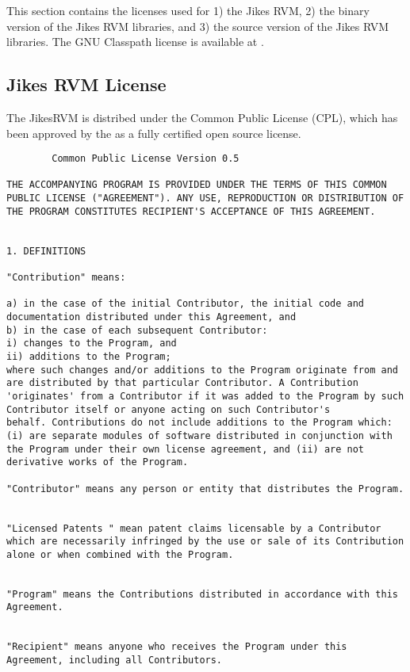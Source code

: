 This section contains the licenses used for 1) the Jikes\trademark
RVM, 2) the binary 
version of the Jikes RVM libraries, and 3) the source version of the
Jikes RVM libraries.  The GNU Classpath license is available
at \xlink{{\tt \classpathURL}}{\classpathURL}.  


\subsection{Jikes RVM License}
The Jikes\trademark RVM is distribed under the Common Public License (CPL),
which has been approved by the 
as a fully certified open source license.


\begin{verbatim}
		Common Public License Version 0.5 

THE ACCOMPANYING PROGRAM IS PROVIDED UNDER THE TERMS OF THIS COMMON
PUBLIC LICENSE ("AGREEMENT"). ANY USE, REPRODUCTION OR DISTRIBUTION OF
THE PROGRAM CONSTITUTES RECIPIENT'S ACCEPTANCE OF THIS AGREEMENT.


1. DEFINITIONS 

"Contribution" means: 

a) in the case of the initial Contributor, the initial code and
documentation distributed under this Agreement, and  
b) in the case of each subsequent Contributor:
i) changes to the Program, and
ii) additions to the Program;
where such changes and/or additions to the Program originate from and
are distributed by that particular Contributor. A Contribution
'originates' from a Contributor if it was added to the Program by such
Contributor itself or anyone acting on such Contributor's
behalf. Contributions do not include additions to the Program which:
(i) are separate modules of software distributed in conjunction with
the Program under their own license agreement, and (ii) are not
derivative works of the Program. 

"Contributor" means any person or entity that distributes the Program. 


"Licensed Patents " mean patent claims licensable by a Contributor
which are necessarily infringed by the use or sale of its Contribution
alone or when combined with the Program.  


"Program" means the Contributions distributed in accordance with this
Agreement.  


"Recipient" means anyone who receives the Program under this
Agreement, including all Contributors.  



\end{verbatim}

